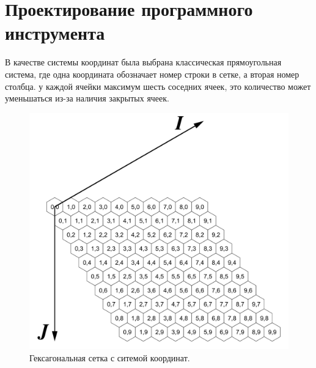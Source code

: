 \chapter{Проектирование программного инструмента}
\label{cha:ch_2}


В качестве системы координат была выбрана классическая прямоугольная система, 
где одна координата обозначает номер строки в сетке, а вторая номер столбца.
у каждой ячейки максимум шесть соседних ячеек, это количество может уменьшаться 
из-за наличия закрытых ячеек.

\begin{figure}[h]
	\begin{center}
		\begin{minipage}[h]{0.47\linewidth}
			\includegraphics[width=1\linewidth]{inc/img/axies}
			\caption{Гексагональная сетка с ситемой координат.} %
			\label{axis:cube} %
		\end{minipage}
		\hfill 
		\begin{minipage}[h]{0.47\linewidth}

\end{minipage}
\end{center}
\end{figure}
